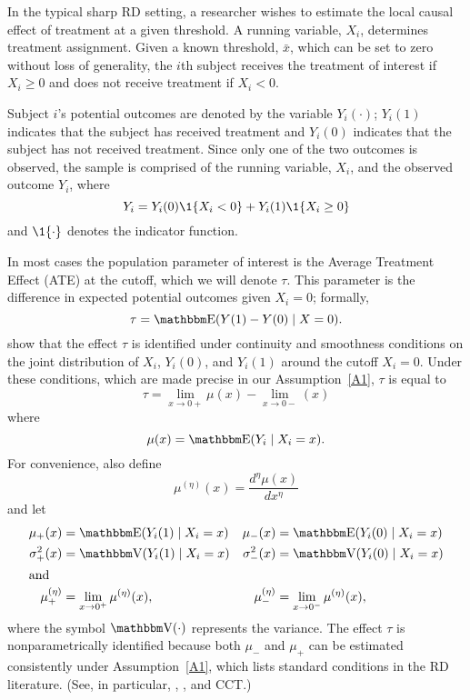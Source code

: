 \documentclass[12pt,fleqn]{article}
\begin{document}
In the typical sharp RD setting, a researcher wishes to estimate the local
causal effect of treatment at a given threshold. A running variable, $X_{i}$,
determines treatment assignment.  Given a known threshold, $\bar{x}$, which can
be set to zero without loss of generality, the $i$th subject receives the
treatment of interest if $X_{i} \geq 0$ and does not receive treatment if
$X_{i} < 0$.

Subject $i$'s potential outcomes are denoted by the variable $Y_i(\cdot)$;
$Y_i(1)$ indicates that the subject has received treatment and $Y_i(0)$
indicates that the subject has not received treatment. Since only one of the two
outcomes is observed, the sample is comprised of the running variable, $X_{i}$,
and the observed outcome $Y_i$, where
\begin{equation*}
  Y_{i}=Y_{i}(0) \1\{X_{i}<0\}+Y_{i}(1) \1\{X_{i} \geq 0\}
\end{equation*}
and $\1\{ \cdot\}$ denotes the indicator function.

In most cases the population parameter of interest is the Average Treatment
Effect (ATE) at the cutoff, which we will denote $\tau$. This parameter is the
difference in expected potential outcomes given $X_i = 0$; formally,
\begin{equation*}
  \tau=\E(Y(1)-Y(0) \mid X=0).
\end{equation*}
\cite{HTV2001} show that the effect $\tau$ is identified under continuity and
smoothness conditions on the joint distribution of $X_i$, $Y_i(0)$, and $Y_i(1)$
around the cutoff $X_i = 0$. Under these conditions, which are made precise
in our Assumption~\ref{A1}, $\tau$ is equal to
\begin{equation*}
  \tau = \lim_{x \to 0+} \mu(x) - \lim_{x \to 0-}(x)
\end{equation*}
where
\begin{equation*}
  \mu(x)= \E(Y_{i} \mid X_{i}=x).
\end{equation*}
For convenience, also define
\begin{equation*}
  \mu^{(\eta)}(x)=\frac{d^{\eta}\mu(x)}{dx^{\eta}}
\end{equation*}
and let
\begin{align*}
  \mu_{+}(x)
  &= \E( Y_{i}(1) \mid X_{i}=x )
  &\mu_{-}(x)
  &= \E( Y_{i}(0) \mid X_{i}=x ) \\
  \sigma^{2}_{+}(x) &= \V( Y_{i}(1) \mid X_{i}=x )
  &\sigma^{2}_{-}(x)&=\V( Y_{i}(0) \mid X_{i}=x ) \\
\intertext{and}
  \mu^{(\eta)}_{+}
  &= \lim_{x \rightarrow 0^{+}}\mu^{(\eta)}(x),
  &\mu^{(\eta)}_{-}
  &= \lim_{x \rightarrow 0^{-}}\mu^{(\eta)}(x),
\end{align*}
where the symbol $\V(\cdot)$ represents the variance.  The effect $\tau$ is
nonparametrically identified because both $\mu_-$ and $\mu_+$ can be estimated
consistently under Assumption~\ref{A1}, which lists standard conditions in the
RD literature. (See, in particular, \citealp{HTV2001}, \citealp{Porter03}, and
CCT.)
\end{document}
